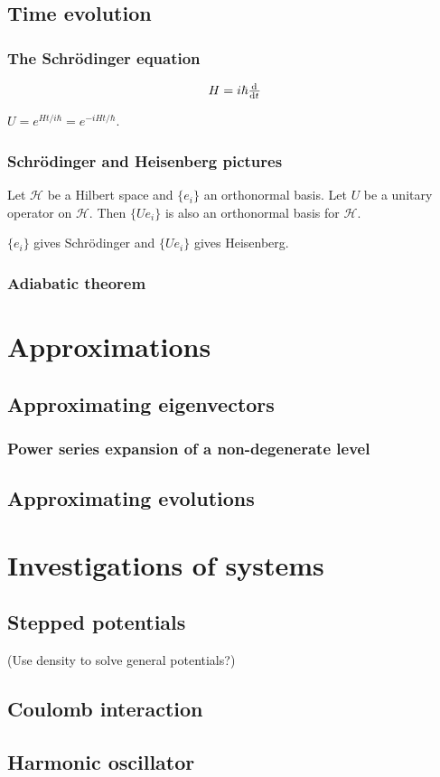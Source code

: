 \section{Time evolution}
\subsection{The Schrödinger equation}
\[ H = i\hbar\od{}{t} \]

\begin{lemma}
$U = e^{Ht / i\hbar} = e^{-iHt/\hbar}$.
\end{lemma}


\subsection{Schrödinger and Heisenberg pictures}
\begin{lemma}
Let $\mathcal{H}$ be a Hilbert space and $\{e_i\}$ an orthonormal basis. Let $U$ be a unitary operator on $\mathcal{H}$. Then $\{Ue_i\}$ is also an orthonormal basis for $\mathcal{H}$.
\end{lemma}
$\{e_i\}$ gives Schrödinger and $\{Ue_i\}$ gives Heisenberg.



\subsection{Adiabatic theorem}

\chapter{Approximations}
\section{Approximating eigenvectors}
\subsection{Power series expansion of a non-degenerate level}

\section{Approximating evolutions}

\chapter{Investigations of systems}
\section{Stepped potentials}
(Use density to solve general potentials?)
\section{Coulomb interaction}
\section{Harmonic oscillator}